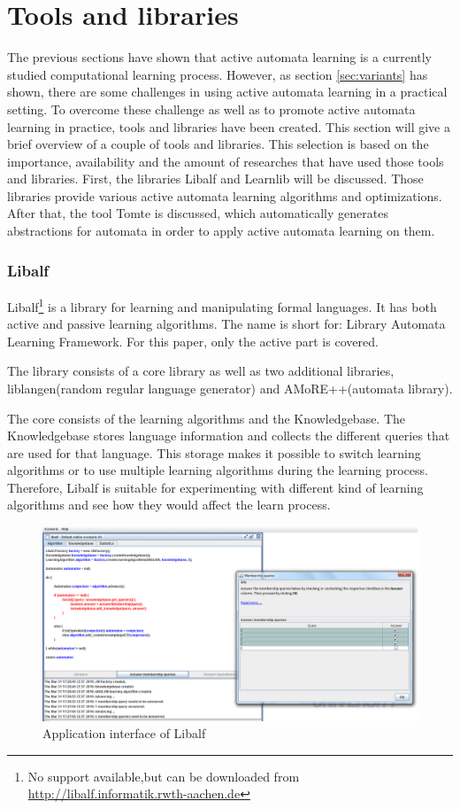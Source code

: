 \documentclass[multi,crop=false,class=article]{standalone}
\begin{document}
\section{Tools and libraries}
\label{sec:tools}
The previous sections have shown that active automata learning is a currently 
studied computational learning process. However, as section 
\ref{sec:variants} has shown, there are some challenges in using active 
automata learning in a practical setting. To overcome these challenge as well 
as to promote active automata learning in practice, tools and libraries have 
been created. This section will give a brief overview of a couple of tools and 
libraries. This selection is based on the importance, availability and the 
amount of researches that have used those tools and libraries. First, the 
libraries Libalf and Learnlib will be discussed. Those libraries provide 
various active automata learning algorithms and optimizations. After that, the 
tool Tomte is discussed, which automatically generates abstractions for 
automata in order to apply active automata learning on them. 


\subsubsection{Libalf}
\label{sssec:libalf}
Libalf\footnote{No support available,but can be downloaded from 
	\url{http://libalf.informatik.rwth-aachen.de}} is a library for learning 
	and manipulating formal languages. It has both active and passive learning 
	algorithms. The name is short for: Library Automata Learning Framework. For 
	this paper, only the active part is covered.

The library consists of a core library as well as two additional libraries, 
liblangen(random regular language generator) and AMoRE++(automata library).

The core consists of the learning algorithms and the Knowledgebase. The 
Knowledgebase stores language information and collects the different queries 
that are used for that language. This storage makes it possible to switch 
learning algorithms or to use multiple learning algorithms during the learning 
process. Therefore, Libalf is suitable for experimenting with different kind of 
learning algorithms and see how they would affect the learn process. 

\begin{figure}[!ht]
	\includegraphics[width=\textwidth]{Tool_images/libalf_demo_interface.png}
	\caption{Application interface of Libalf}
	\label{fig:libalf_interface}
\end{figure}
\end{document}

